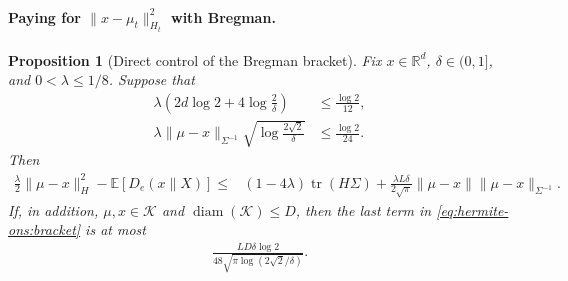 \documentclass{article}
\theoremstyle{plain}
\newtheorem{proposition}[theorem]{Proposition}
\theoremstyle{definition}
\theoremstyle{plain}
\newcommand{\R}{\mathbb R}
\newcommand{\tr}{\operatorname{tr}}
\newcommand{\E}{\mathbb E}
\newcommand{\cK}{\mathcal K}
\begin{document}
\paragraph{Paying for $\|x - \mu_t\|_{H_t}^2$ with Bregman.}
\begin{proposition}[Direct control of the Bregman bracket]
    \label{prop:hermite-ons:bracket}
    Fix $x\in\R^d$, $\delta\in(0,1]$, and $0<\lambda\leq1/8$.
    Suppose that
    \begin{align}
        \lambda
        \left(
        2d\log 2+4\log\frac{2}{\delta}
        \right)
         & \leq \frac{\log 2}{12},
        \label{eq:hermite-ons:bracket-dimension}
        \\
        \lambda
        \|\mu-x\|_{\Sigma^{-1}}
        \sqrt{\log\frac{2\sqrt{2}}{\delta}}
         & \leq \frac{\log 2}{24}.
        \label{eq:hermite-ons:bracket-focus}
    \end{align}
    Then
    \begin{align}
        \frac{\lambda}{2}\|\mu-x\|_H^2
        -\E[D_e(x\|X)]
        \leq{} &
        (1-4\lambda)\tr(H\Sigma)
        +
        \frac{\lambda L\delta}{2\sqrt{\pi}}
        \|\mu-x\|
        \|\mu-x\|_{\Sigma^{-1}}.
        \label{eq:hermite-ons:bracket}
    \end{align}
    If, in addition, $\mu,x\in\cK$ and
    $\operatorname{diam}(\cK)\leq D$, then the last term in
    \eqref{eq:hermite-ons:bracket} is at most
    \begin{align}
        \frac{LD\delta\log 2}
        {48\sqrt{\pi\log(2\sqrt{2}/\delta)}}.
        \label{eq:hermite-ons:bracket-bounded-error}
    \end{align}
\end{proposition}
\end{document}
